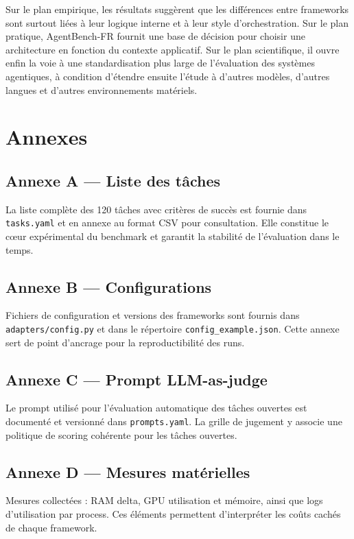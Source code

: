 \documentclass[11pt,a4paper]{article}
\begin{document}
Sur le plan empirique, les résultats suggèrent que les différences entre frameworks sont surtout liées à leur logique interne et à leur style d'orchestration. Sur le plan pratique, AgentBench-FR fournit une base de décision pour choisir une architecture en fonction du contexte applicatif. Sur le plan scientifique, il ouvre enfin la voie à une standardisation plus large de l'évaluation des systèmes agentiques, à condition d'étendre ensuite l'étude à d'autres modèles, d'autres langues et d'autres environnements matériels.

\appendix
\section{Annexes}
\label{sec:annexes}

\subsection*{Annexe A — Liste des tâches}
La liste complète des 120 tâches avec critères de succès est fournie dans \texttt{tasks.yaml} et en annexe au format CSV pour consultation. Elle constitue le cœur expérimental du benchmark et garantit la stabilité de l'évaluation dans le temps.



\subsection*{Annexe B — Configurations}
Fichiers de configuration et versions des frameworks sont fournis dans \texttt{adapters/config.py} et dans le répertoire \texttt{config\_example.json}. Cette annexe sert de point d'ancrage pour la reproductibilité des runs.

\subsection*{Annexe C — Prompt LLM-as-judge}
Le prompt utilisé pour l'évaluation automatique des tâches ouvertes est documenté et versionné dans \texttt{prompts.yaml}. La grille de jugement y associe une politique de scoring cohérente pour les tâches ouvertes.

\subsection*{Annexe D — Mesures matérielles}
Mesures collectées : RAM delta, GPU utilisation et mémoire, ainsi que logs d'utilisation par process. Ces éléments permettent d'interpréter les coûts cachés de chaque framework.
\end{document}
